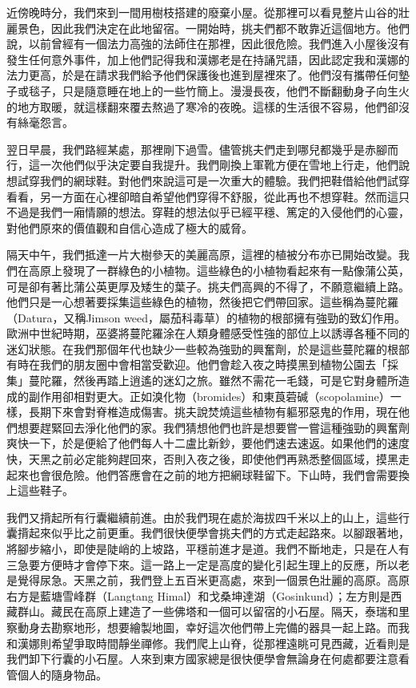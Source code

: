 近傍晚時分，我們來到一間用樹枝搭建的廢棄小屋。從那裡可以看見整片山谷的壯麗景色，因此我們決定在此地留宿。一開始時，挑夫們都不敢靠近這個地方。他們說，以前曾經有一個法力高強的法師住在那裡，因此很危險。我們進入小屋後沒有發生任何意外事件，加上他們記得我和漢娜老是在持誦咒語，因此認定我和漢娜的法力更高，於是在請求我們給予他們保護後也進到屋裡來了。他們沒有攜帶任何墊子或毯子，只是隨意睡在地上的一些竹簡上。漫漫長夜，他們不斷翻動身子向生火的地方取暖，就這樣翻來覆去熬過了寒冷的夜晚。這樣的生活很不容易，他們卻沒有絲毫怨言。


翌日早晨，我們路經某處，那裡剛下過雪。儘管挑夫們走到哪兒都幾乎是赤腳而行，這一次他們似乎決定要自我提升。我們剛換上軍靴方便在雪地上行走，他們說想試穿我們的網球鞋。對他們來說這可是一次重大的體驗。我們把鞋借給他們試穿看看，另一方面在心裡卻暗自希望他們穿得不舒服，從此再也不想穿鞋。然而這只不過是我們一廂情願的想法。穿鞋的想法似乎已經平穩、篤定的入侵他們的心靈，對他們原來的價值觀和自信心造成了極大的威脅。

隔天中午，我們抵達一片大樹參天的美麗高原，這裡的植被分布亦已開始改變。我們在高原上發現了一群綠色的小植物。這些綠色的小植物看起來有一點像蒲公英，可是卻有著比蒲公英更厚及矮生的葉子。挑夫們高興的不得了，不願意繼續上路。他們只是一心想著要採集這些綠色的植物，然後把它們帶回家。這些稱為蔓陀羅（Datura，又稱Jimson
weed，屬茄科毒草）的植物的根部擁有強勁的致幻作用。歐洲中世紀時期，巫婆將蔓陀羅涂在人類身體感受性強的部位上以誘導各種不同的迷幻狀態。在我們那個年代也缺少一些較為強勁的興奮劑，於是這些蔓陀羅的根部有時在我們的朋友圈中會相當受歡迎。他們會趁入夜之時摸黑到植物公園去「採集」蔓陀羅，然後再踏上逍遙的迷幻之旅。雖然不需花一毛錢，可是它對身體所造成的副作用卻相對更大。正如溴化物（bromides）和東莨菪碱（scopolamine）一樣，長期下來會對脊椎造成傷害。挑夫說焚燒這些植物有軀邪惡鬼的作用，現在他們想要趕緊回去淨化他們的家。我們猜想他們也許是想要嘗一嘗這種強勁的興奮劑爽快一下，於是便給了他們每人十二盧比新鈔，要他們速去速返。如果他們的速度快，天黑之前必定能夠趕回來，否則入夜之後，即使他們再熟悉整個區域，摸黑走起來也會很危險。他們答應會在之前的地方把網球鞋留下。下山時，我們會需要換上這些鞋子。

我們又揹起所有行囊繼續前進。由於我們現在處於海拔四千米以上的山上，這些行囊揹起來似乎比之前更重。我們很快便學會挑夫們的方式走起路來。以腳跟著地，將腳步縮小，即使是陡峭的上坡路，平穩前進才是道。我們不斷地走，只是在人有三急要方便時才會停下來。這一路上一定是高度的變化引起生理上的反應，所以老是覺得尿急。天黑之前，我們登上五百米更高處，來到一個景色壯麗的高原。高原右方是藍塘雪峰群（Langtang
Himal）和戈桑坤達湖（Gosinkund）；左方則是西藏群山。藏民在高原上建造了一些佛塔和一個可以留宿的小石屋。隔天，泰瑞和里察動身去勘察地形，想要繪製地圖，幸好這次他們帶上完備的器具一起上路。而我和漢娜則希望爭取時間靜坐禪修。我們爬上山脊，從那裡遠眺可見西藏，近看則是我們卸下行囊的小石屋。人來到東方國家總是很快便學會無論身在何處都要注意看管個人的隨身物品。

